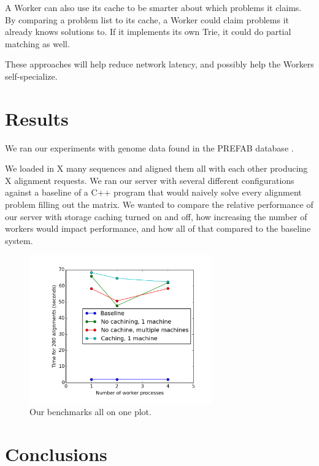\documentclass[12pt]{article}
\begin{document}
A Worker can also use its cache to be smarter about which problems it claims. By comparing a problem list to its cache, a Worker could claim problems it already knows solutions to. If it implements its own Trie, it could do partial matching as well.

These approaches will help reduce network latency, and possibly help the Workers self-specialize.






\section{Results}

We ran our experiments with genome data found in the PREFAB database \cite{Edgar:04}.

We loaded in X many sequences and aligned them all with each other producing X alignment requests. We ran our server with several different configurations against a baseline of a C++ program that would naively solve every alignment problem filling out the matrix. We wanted to compare the relative performance of our server with storage caching turned on and off, how increasing the number of workers would impact performance, and how all of that compared to the baseline system.

\begin{figure}
  \centering 
  \includegraphics[width=0.7\textwidth]{benchmarks}
  \caption{Our benchmarks all on one plot.}
  \label{fig:benchmarks}
\end{figure}



\section{Conclusions} 
\end{document}
